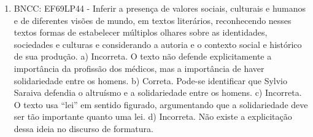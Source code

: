 \begin{enumerate}
\item
BNCC: EF69LP44 - Inferir a presença de valores sociais, culturais e
humanos e de diferentes visões de mundo, em textos literários,
reconhecendo nesses textos formas de estabelecer múltiplos olhares sobre
as identidades, sociedades e culturas e considerando a autoria e o
contexto social e histórico de sua produção. a) Incorreta. O texto não defende explicitamente a importância da profissão dos médicos, mas a importância de haver solidariedade entre os homens. b) Correta. Pode-se identificar que Sylvio Saraiva defendia o altruísmo e a solidariedade entre os homens. c) Incorreta. O texto usa ``lei'' em sentido figurado, argumentando que a solidariedade deve ser tão importante quanto uma lei. d) Incorreta. Não existe a explicitação dessa ideia no discurso de
formatura.
\end{enumerate}


